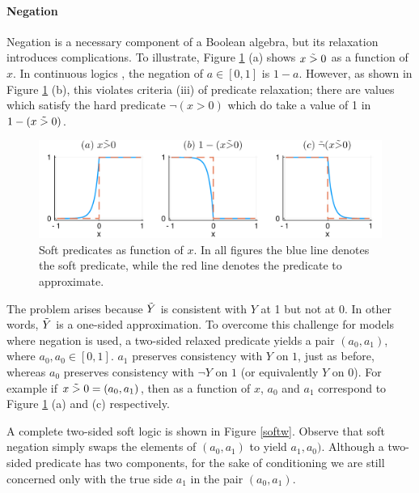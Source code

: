 \paragraph{Negation}
Negation is a necessary component of a Boolean algebra, but its relaxation introduces complications.
To illustrate, Figure \ref{negationimg} (a) shows $x \mathrel{\tilde{>}} 0$ as a function of $x$.
In continuous logics \cite{kimmig2012short}, the negation of $a \in [0, 1]$ is $1 - a$.
However, as shown in Figure \ref{negationimg} (b), this violates criteria (iii) of predicate relaxation; there are values which satisfy the hard predicate $\neg(x > 0)$ which do take a value of 1 in $1 - (x \mathrel{\tilde{>}} 0)$.

\begin{figure}
\includegraphics[width=\linewidth]{negation.pdf}
\caption{Soft predicates as function of $x$.  In all figures the blue line denotes the soft predicate, while the red line denotes the predicate to approximate.}\label{negationimg}
\end{figure}


The problem arises because $\tilde{Y}$ is consistent with $Y$ at 1 but not at 0.
In other words, $\tilde{Y}$ is a one-sided approximation.
To overcome this challenge for models where negation is used, a two-sided relaxed predicate yields a pair $(a_0, a_1)$, where $a_0, a_0 \in [0, 1]$.
$a_1$ preserves consistency with $Y$ on $1$, just as before, whereas $a_0$ preserves consistency with $\neg Y$ on $1$ (or equivalently $Y$ on 0).
For example if $x \mathrel{\tilde{>}} 0 = (a_0, a_1)$, then as a function of $x$, $a_0$ and $a_1$ correspond to Figure \ref{negationimg} (a) and (c) respectively.

A complete two-sided soft logic is shown in Figure \ref{softw}.
Observe that soft negation simply swaps the elements of $(a_0, a_1)$ to yield $a_1, a_0)$.
Although a two-sided predicate has two components, for the sake of conditioning we are still concerned only with the true side $a_1$ in the pair $(a_0, a_1)$.


